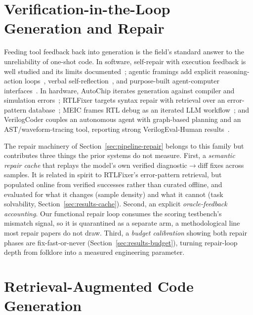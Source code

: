 \section{Verification-in-the-Loop Generation and Repair}
\label{sec:rw-repair}

Feeding tool feedback back into generation is the field's standard answer
to the unreliability of one-shot code. In software,
self-repair with execution feedback is well studied and its limits
documented~\citep{olausson2024selfrepair}; agentic framings add explicit
reasoning-action loops~\citep{yao2023react}, verbal
self-reflection~\citep{shinn2023reflexion}, and purpose-built
agent-computer interfaces~\citep{yang2024sweagent}. In hardware,
AutoChip iterates generation against compiler and simulation
errors~\citep{thakur2024autochip}; RTLFixer targets syntax repair with
retrieval over an error-pattern database~\citep{tsai2024rtlfixer}; MEIC
frames RTL debug as an iterated LLM workflow~\citep{xu2024meic}; and
VerilogCoder couples an autonomous agent with graph-based planning and an
AST/waveform-tracing tool, reporting strong VerilogEval-Human
results~\citep{ho2025verilogcoder}.

The repair machinery of Section~\ref{sec:pipeline-repair} belongs to this
family but contributes three things the prior systems do not measure.
First, a \emph{semantic repair cache} that replays the model's own
verified diagnostic$\to$diff fixes across samples. It is related in spirit to
RTLFixer's error-pattern retrieval, but populated online from verified
successes rather than curated offline, and evaluated for what it changes
(sample density) and what it cannot (task solvability,
Section~\ref{sec:results-cache}). Second, an explicit
\emph{oracle-feedback accounting}. Our functional repair loop consumes the
scoring testbench's mismatch signal, so it is quarantined as a separate
arm, a methodological line most repair papers do not draw. Third, a
\emph{budget calibration} showing both repair phases are fix-fast-or-never
(Section~\ref{sec:results-budget}), turning repair-loop depth from
folklore into a measured engineering parameter.

\section{Retrieval-Augmented Code Generation}
\label{sec:rw-rag}

